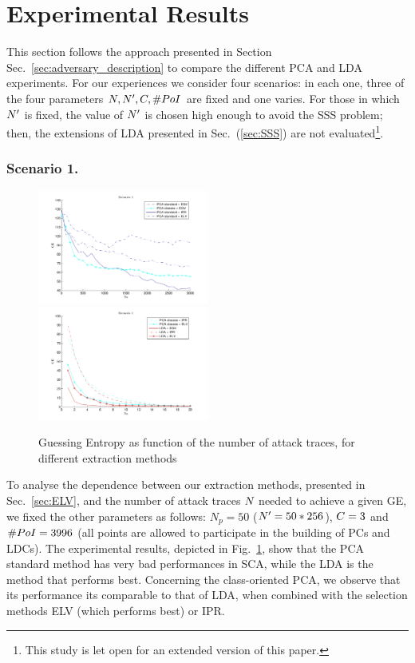 \section{Experimental Results}
This section follows the approach presented in Section Sec.~\ref{sec:adversary_description} to compare the different PCA and LDA experiments. For our experiences we consider four scenarios: in each one, three of the four parameters $\numTraces[], \numTraces[]', \newTraceLength, \numPoI$ are fixed and one varies. For those in which $\numTraces[]'$ is fixed, the value of $\numTraces[]'$ is chosen high enough to avoid the SSS problem; then, the extensions of LDA presented in Sec.~(\ref{sec:SSS}) are not evaluated\footnote{This study is let open for an extended version of this paper.}.

\subsubsection{Scenario 1.}
\begin{figure}
\includegraphics[width=0.5\textwidth]{figures/Criterion1.pdf}
\includegraphics[width=0.5\textwidth]{figures/Criterion1Good.pdf} 
\caption{Guessing Entropy as function of the number of attack traces, for different extraction methods}\label{fig:1}
\end{figure}
To analyse the dependence between our extraction methods, presented in Sec.~\ref{sec:ELV}, and the number of attack traces $\numTraces[]$ needed to achieve a given GE, we fixed the other parameters as follows: $N_p=50$ ($\numTraces[]'=50*256$), $\newTraceLength = 3$ and $\numPoI = 3996$ (all points are allowed to participate in the building of PCs and LDCs). The experimental results, depicted in Fig.~\ref{fig:1}, show that the PCA standard method has very bad performances in SCA, while the LDA is the method that performs best. Concerning the class-oriented PCA, we observe that its performance its comparable to that of LDA, when combined with the selection methods ELV (which performs best) or IPR.  \\


